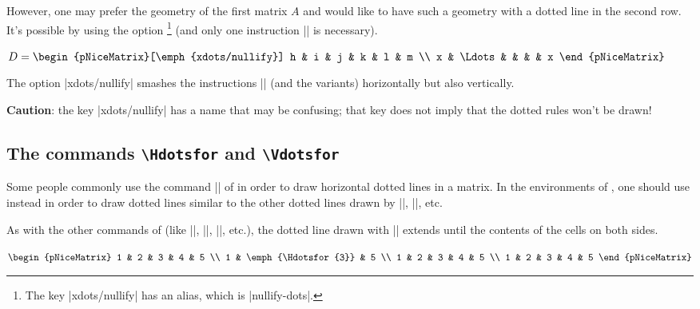 \documentclass[dvipsnames]{article}
\begin{document}
\bigskip
However, one may prefer the geometry of the first matrix $A$ and would like to
have such a geometry with a dotted line in the second row. It's possible by
using the option \footnote{The key |xdots/nullify| has
  an alias, which is |nullify-dots|.} (and only one instruction |\Ldots| is
necessary).

\nobreak
\medskip
\begin{Code}[width=10cm,show-output]
$D = \begin{pNiceMatrix}[\emph{xdots/nullify}]
h & i & j & k & l & m \\
x & \Ldots & &  &  & x 
\end{pNiceMatrix}$
\end{Code}

\medskip
The option |xdots/nullify| smashes the instructions |\Ldots| (and the variants)
horizontally but also vertically.

\medskip
\textbf{Caution}: the key |xdots/nullify| has a name that may be confusing; that
key does not imply that the dotted rules won't be drawn!



\subsection{The commands \texttt{\textbackslash Hdotsfor} and \texttt{\textbackslash Vdotsfor}}


Some people commonly use the command |\hdotsfor| of  in order to
draw horizontal dotted lines in a matrix. In the environments of
, one should use instead  in order
to draw dotted lines similar to the other dotted lines drawn by |\Cdots|, |\Vdots|, etc.


As with the other commands of  (like |\Cdots|, |\Ldots|,
|\Vdots|, etc.), the dotted line drawn with |\Hdotsfor| extends until the
contents of the cells on both sides.

\medskip
\begin{Code}[width=7cm,show-output]
$\begin{pNiceMatrix}
1 & 2 & 3 & 4 & 5 \\
1 & \emph{\Hdotsfor{3}} & 5 \\
1 & 2 & 3 & 4 & 5 \\
1 & 2 & 3 & 4 & 5 
\end{pNiceMatrix}$
\end{Code}
\end{document}
